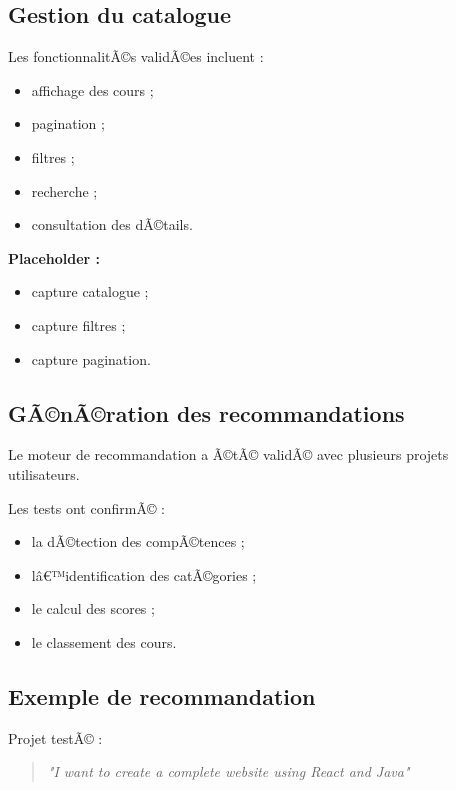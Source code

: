 ﻿\documentclass[12pt,a4paper]{report}
\begin{document}
\subsection{Gestion du catalogue}

Les fonctionnalitÃ©s validÃ©es incluent :
\begin{itemize}
    \item affichage des cours ;
    \item pagination ;
    \item filtres ;
    \item recherche ;
    \item consultation des dÃ©tails.
\end{itemize}

\vspace{0.3cm}

\textbf{Placeholder :}
\begin{itemize}
    \item capture catalogue ;
    \item capture filtres ;
    \item capture pagination.
\end{itemize}

\subsection{GÃ©nÃ©ration des recommandations}

Le moteur de recommandation a Ã©tÃ© validÃ© avec plusieurs projets utilisateurs.

Les tests ont confirmÃ© :
\begin{itemize}
    \item la dÃ©tection des compÃ©tences ;
    \item lâ€™identification des catÃ©gories ;
    \item le calcul des scores ;
    \item le classement des cours.
\end{itemize}

\subsection{Exemple de recommandation}

Projet testÃ© :

\begin{quote}
\textit{
"I want to create a complete website using React and Java"
}
\end{quote}
\end{document}
